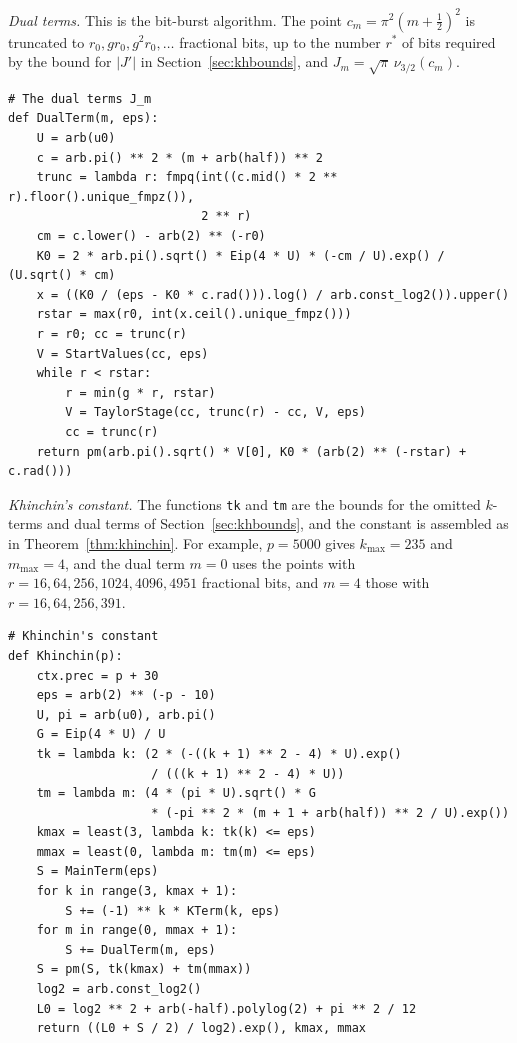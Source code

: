 \documentclass[11pt,reqno]{amsart}
\theoremstyle{definition}
\theoremstyle{remark}
\begin{document}
\emph{Dual terms.} This is the bit-burst algorithm. The point $c_m = \pi^2(m+\frac12)^2$ is truncated to
$r_0, gr_0, g^2r_0, \dots$ fractional bits, up to the number $r^*$ of bits required by the bound for $|J'|$ in
Section~\ref{sec:khbounds}, and $J_m = \sqrt\pi\,\nu_{3/2}(c_m)$.
\begin{lstlisting}[style=ref, firstnumber=144]
# The dual terms J_m
def DualTerm(m, eps):
    U = arb(u0)
    c = arb.pi() ** 2 * (m + arb(half)) ** 2
    trunc = lambda r: fmpq(int((c.mid() * 2 ** r).floor().unique_fmpz()),
                           2 ** r)
    cm = c.lower() - arb(2) ** (-r0)
    K0 = 2 * arb.pi().sqrt() * Eip(4 * U) * (-cm / U).exp() / (U.sqrt() * cm)
    x = ((K0 / (eps - K0 * c.rad())).log() / arb.const_log2()).upper()
    rstar = max(r0, int(x.ceil().unique_fmpz()))
    r = r0; cc = trunc(r)
    V = StartValues(cc, eps)
    while r < rstar:
        r = min(g * r, rstar)
        V = TaylorStage(cc, trunc(r) - cc, V, eps)
        cc = trunc(r)
    return pm(arb.pi().sqrt() * V[0], K0 * (arb(2) ** (-rstar) + c.rad()))
\end{lstlisting}

\emph{Khinchin's constant.} The functions \texttt{tk} and \texttt{tm} are the bounds for the omitted $k$-terms and
dual terms of Section~\ref{sec:khbounds}, and the constant is assembled as in Theorem~\ref{thm:khinchin}. For
example, $p = 5000$ gives $k_{\max} = 235$ and $m_{\max} = 4$, and the dual term $m = 0$ uses the points with
$r = 16, 64, 256, 1024, 4096, 4951$ fractional bits, and $m = 4$ those with $r = 16, 64, 256, 391$.
\begin{lstlisting}[style=ref, firstnumber=162]
# Khinchin's constant
def Khinchin(p):
    ctx.prec = p + 30
    eps = arb(2) ** (-p - 10)
    U, pi = arb(u0), arb.pi()
    G = Eip(4 * U) / U
    tk = lambda k: (2 * (-((k + 1) ** 2 - 4) * U).exp()
                    / (((k + 1) ** 2 - 4) * U))
    tm = lambda m: (4 * (pi * U).sqrt() * G
                    * (-pi ** 2 * (m + 1 + arb(half)) ** 2 / U).exp())
    kmax = least(3, lambda k: tk(k) <= eps)
    mmax = least(0, lambda m: tm(m) <= eps)
    S = MainTerm(eps)
    for k in range(3, kmax + 1):
        S += (-1) ** k * KTerm(k, eps)
    for m in range(0, mmax + 1):
        S += DualTerm(m, eps)
    S = pm(S, tk(kmax) + tm(mmax))
    log2 = arb.const_log2()
    L0 = log2 ** 2 + arb(-half).polylog(2) + pi ** 2 / 12
    return ((L0 + S / 2) / log2).exp(), kmax, mmax
\end{lstlisting}
\end{document}
